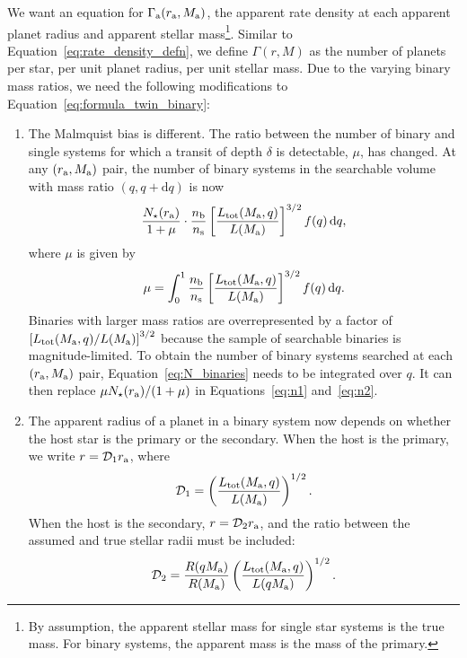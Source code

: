 \documentclass[12pt,modern]{aastex61}
\renewcommand{\a}{_{\rm a}}
\begin{document}
We want an equation for $\Gamma\a(r\a,M\a)$, the apparent rate density
at each apparent planet radius and apparent stellar mass\footnote{By
assumption, the apparent stellar mass for single star systems is the
true mass. For binary systems, the apparent mass is the mass of the
primary.}.
Similar to Equation~\ref{eq:rate_density_defn}, we define
$\Gamma(r,M)$ as the number of planets per star, per unit planet radius,
per unit stellar mass.  Due to the varying binary mass ratios, we need
the following modifications to Equation~\ref{eq:formula_twin_binary}:
%
\begin{enumerate}
%
\item The Malmquist bias is different. The ratio between the number of
binary and single systems for which a transit of depth $\delta$ is
detectable, $\mu$, has changed.  At any $(r\a,M\a)$ pair, the number
of binary systems in the searchable volume with mass ratio $(q,
q+\mathrm{d}q)$ is now
\begin{equation}
    {N_\star(r\a)\over{1+\mu}}\cdot {n_{\rm b}\over n_{\rm s}}
    \left[{L_{\rm tot}(M\a, q) \over L(M\a)}\right]^{3/2}
    f(q)\,\mathrm{d}q,
    \label{eq:N_binaries}
\end{equation}
where $\mu$ is given by
\begin{equation}
    \mu= 
    \int_0^1 {n_{\rm b}\over n_{\rm s}}\left[{L_{\rm tot}(M\a, q)
    \over L(M\a)}\right]^{3/2} f(q)\,\mathrm{d}q.
    \label{eq:mu_general}
\end{equation}
Binaries with larger mass ratios are overrepresented by a factor of
$\left[{L_{\rm tot}(M\a, q)/L(M\a)}\right]^{3/2}$ because the
sample of searchable binaries is magnitude-limited.  To obtain
the number of binary systems searched at each $(r\a,M\a)$ pair,
Equation~\ref{eq:N_binaries} needs to be integrated over $q$.  It
can then replace ${\mu N_\star(r\a)/(1+\mu)}$ in
Equations~\ref{eq:n1} and~\ref{eq:n2}.

\item The apparent radius of a planet in a binary system now depends
on whether the host star is the primary or the secondary. When the host
is the primary, we write
$r=\mathcal{D}_1 r\a$, where
\begin{equation}
    \mathcal{D}_1
    = \left( \frac{ L_{\rm tot}(M\a, q)}{ L(M\a) } \right)^{1/2}.
    \label{eq:dil_1}
\end{equation}
When the host is the secondary, $r=\mathcal{D}_2 r\a$, and the
ratio between the assumed and true stellar radii must be included:
\begin{equation}
  \mathcal{D}_2
  = \frac{R(qM\a)}{R(M\a)}
    \left( \frac{L_{\rm tot}(M\a, q)}{L(qM\a)} \right)^{1/2}.
  \label{eq:dil_2}
\end{equation}


\end{enumerate}
\end{document}
